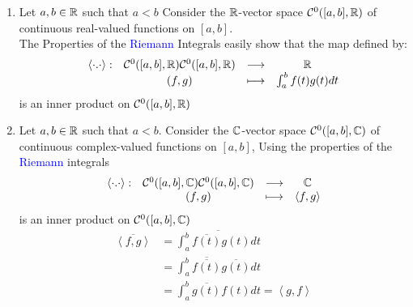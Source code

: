 \documentclass{report}
\begin{document}
\begin{enumerate}[(1)]
\item  Let $a,b \in  \mathbb{R}  $  such that $a <  b $ Consider the 
	$\mathbb{R}  $-vector space  
	$\mathcal{C}^{0} ([a,b], \mathbb{R} ) $ of continuous real-valued
	functions on $[a,b]  $. \\
	The Properties of the \textcolor{blue}{Riemann} Integrals 
	easily show that the map defined by: 
	\[
	\begin{array}{cccc}
	      \left\langle \cdot .\cdot  \right\rangle  : &  
	      \mathcal{C} ^{0}([a,b],\mathbb{R} ) \mathcal{C} ^{0}([a,b],\mathbb{R} ) 
		  & \longrightarrow &  \mathbb{R} \\
	
	           &(f,g)     & \longmapsto     &  
		   \int_{a}^{b} 
		   f(t) g(t) dt
		   \\
	\end{array}
	\]
	is an inner product on $\mathcal{C} ^{0}([a,b],\mathbb{R} )  $  
\item Let $a,b \in  \mathbb{R}  $ such that $a < b $. Consider the 
	$\mathbb{C}  $-vector space 
	$\mathcal{C} ^{0}([a,b],\mathbb{C} ) $  of continuous
	complex-valued functions on $[a,b] $, Using the properties
	of the \textcolor{blue}{Riemann} integrals  
	\[
	\begin{array}{cccc}
	      \left\langle \cdot .\cdot  \right\rangle  : &  
	      \mathcal{C} ^{0}([a,b],\mathbb{C}  ) \mathcal{C} ^{0}([a,b],\mathbb{C}  ) 
		  & \longrightarrow &  \mathbb{C}  \\
	
	           &(f,g)     & \longmapsto     &   
		   \left\langle f,g \right\rangle 
		   \\
	\end{array}
	\]
	is an inner product on $\mathcal{C} ^{0}
	([a,b],\mathbb{C})$  
	\divider
	\begin{align*}
		\overline{\left\langle f,g \right\rangle } 
		&=
		\overline{
	\int_{a}^{b} 
	\overline{f(t) }g(t) dt 
		}
\\
	   &= 
	   \int_{a}^{b} 
	   \overline{\overline{f(t) }} 
	   \overline{g(t) } dt \\
	   &=
	   \int_{a}^{b} 
	   \overline{g(t) } 
	   f(t) dt = 
	   \left\langle g,f \right\rangle 
	   \\
	\end{align*}
\end{enumerate}
\normalfont
\newpage
\end{document}
